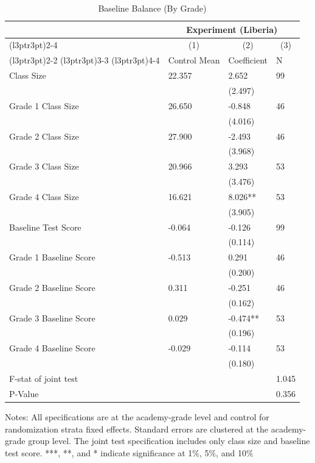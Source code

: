 \begin{table}[!h]
\centering
\caption{Baseline Balance (By Grade)}
\centering
\begin{threeparttable}
\begin{tabular}[t]{llll}
\toprule
\multicolumn{1}{c}{ } & \multicolumn{3}{c}{Experiment (Liberia)} \\
\cmidrule(l{3pt}r{3pt}){2-4}
\multicolumn{1}{c}{ } & \multicolumn{1}{c}{(1)} & \multicolumn{1}{c}{(2)} & \multicolumn{1}{c}{(3)} \\
\cmidrule(l{3pt}r{3pt}){2-2} \cmidrule(l{3pt}r{3pt}){3-3} \cmidrule(l{3pt}r{3pt}){4-4}
 & Control Mean & Coefficient & N\\
\midrule
Class Size & 22.357 & 2.652 & 99\\
 &  & (2.497) & \\
Grade 1 Class Size & 26.650 & -0.848 & 46\\
 &  & (4.016) & \\
Grade 2 Class Size & 27.900 & -2.493 & 46\\
 &  & (3.968) & \\
Grade 3 Class Size & 20.966 & 3.293 & 53\\
 &  & (3.476) & \\
Grade 4 Class Size & 16.621 & 8.026** & 53\\
 &  & (3.905) & \\
Baseline Test Score & -0.064 & -0.126 & 99\\
 &  & (0.114) & \\
Grade 1 Baseline Score & -0.513 & 0.291 & 46\\
 &  & (0.200) & \\
Grade 2 Baseline Score & 0.311 & -0.251 & 46\\
 &  & (0.162) & \\
Grade 3 Baseline Score & 0.029 & -0.474** & 53\\
 &  & (0.196) & \\
Grade 4 Baseline Score & -0.029 & -0.114 & 53\\
 &  & (0.180) & \\
\hline
\midrule
F-stat of joint test &  &  & 1.045\\
P-Value &  &  & 0.356\\
\bottomrule
\end{tabular}
\begin{tablenotes}[para]
\item Notes: All specifications are at the academy-grade level and control for randomization strata fixed effects. Standard errors are clustered at the academy-grade group level. The joint test specification includes only class size and baseline test score. ***, **, and * indicate significance at 1\%, 5\%, and 10\%
\end{tablenotes}
\end{threeparttable}
\end{table}
